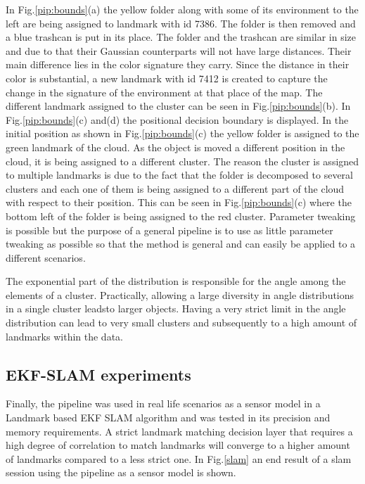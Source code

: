 \documentclass[]{article}
\begin{document}
    In Fig.\ref{pip:bounds}(a) the yellow folder along with some of its environment to the left are being assigned to landmark with id 7386. The folder is then removed and a blue trashcan is put in its place. The folder and the trashcan are similar in size and due to that their Gaussian counterparts will not have large distances. Their main difference lies in the color signature they carry. Since the distance in their color is substantial, a new landmark with id 7412 is created to capture the change in the signature of the environment at that place of the map. The different landmark assigned to the cluster can be seen in Fig.\ref{pip:bounds}(b). In Fig.\ref{pip:bounds}(c) and(d) the positional decision boundary is displayed. In the initial position as shown in Fig.\ref{pip:bounds}(c) the yellow folder is assigned to the green landmark of the cloud. As the object is moved a different position in the cloud, it is being assigned to a different cluster. The reason the cluster is assigned to multiple landmarks is due to the fact that the folder is decomposed to several clusters and each one of them is being assigned to a different part of the cloud with respect to their position. This can be seen in Fig.\ref{pip:bounds}(c) where the bottom left of the folder is being assigned to the red cluster. Parameter tweaking is possible but the purpose of a general pipeline is to use as little parameter tweaking as possible so that the method is general and can easily be applied to a different scenarios.

    The exponential part of the distribution is responsible for the angle among the elements of a cluster. Practically, allowing a large diversity in angle distributions in a single cluster leadsto larger objects. Having a very strict limit in the angle distribution can lead to very small clusters and subsequently to a high amount of landmarks within the data.

    \subsection{EKF-SLAM experiments}

    Finally, the pipeline was used in real life scenarios as a sensor model in a Landmark based EKF SLAM algorithm and was tested in its precision and memory requirements. A strict landmark matching decision layer that requires a high degree of correlation to match landmarks will converge to a higher amount of landmarks compared to a less strict one. In Fig.\ref{slam} an end result of a slam session using the pipeline as a sensor model is shown.
\end{document}
